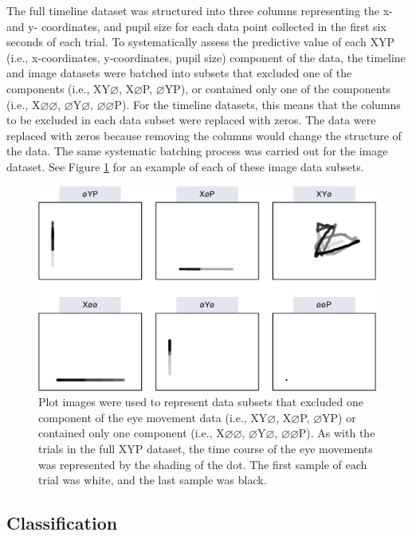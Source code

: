 \documentclass[
  english,
  man, donotrepeattitle,floatsintext]{apa6}
\begin{document}
The full timeline dataset was structured into three columns representing the x- and y- coordinates, and pupil size for each data point collected in the first six seconds of each trial. To systematically assess the predictive value of each XYP (i.e., x-coordinates, y-coordinates, pupil size) component of the data, the timeline and image datasets were batched into subsets that excluded one of the components (i.e., XY\(\varnothing\), X\(\varnothing\)P, \(\varnothing\)YP), or contained only one of the components (i.e., X\(\varnothing\varnothing\), \(\varnothing\)Y\(\varnothing\), \(\varnothing\varnothing\)P). For the timeline datasets, this means that the columns to be excluded in each data subset were replaced with zeros. The data were replaced with zeros because removing the columns would change the structure of the data. The same systematic batching process was carried out for the image dataset. See Figure \ref{fig:ave-subset} for an example of each of these image data subsets.



\begin{figure}
\centering
\includegraphics{figures/subset_imgs.pdf}
\caption{\label{fig:ave-subset}Plot images were used to represent data subsets that excluded one component of the eye movement data (i.e., XY\(\varnothing\), X\(\varnothing\)P, \(\varnothing\)YP) or contained only one component (i.e., X\(\varnothing\varnothing\), \(\varnothing\)Y\(\varnothing\), \(\varnothing\varnothing\)P). As with the trials in the full XYP dataset, the time course of the eye movements was represented by the shading of the dot. The first sample of each trial was white, and the last sample was black.}
\end{figure}

\subsection{Classification}
\end{document}
